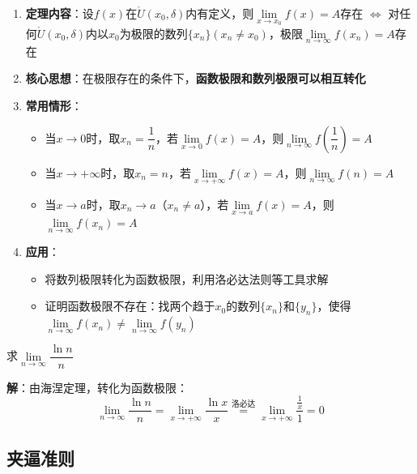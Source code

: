 \documentclass[a4paper,12pt]{article}
\begin{document}
    \begin{enumerate}
        \item \textbf{定理内容}：设$f(x)$在$\mathring{U}(x_0, \delta)$内有定义，则$\lim\limits_{x\to x_0} f(x) = A$存在 $\Leftrightarrow$ 对任何$\mathring{U}(x_0, \delta)$内以$x_0$为极限的数列$\{x_n\}(x_n \neq x_0)$，极限$\lim\limits_{n\to\infty} f(x_n) = A$存在

        \item \textbf{核心思想}：在极限存在的条件下，\textbf{函数极限和数列极限可以相互转化}

        \item \textbf{常用情形}：
        \begin{itemize}
            \item 当$x\to 0$时，取$x_n = \dfrac{1}{n}$，若$\lim\limits_{x\to 0} f(x) = A$，则$\lim\limits_{n\to\infty} f\left(\dfrac{1}{n}\right) = A$
            \item 当$x\to +\infty$时，取$x_n = n$，若$\lim\limits_{x\to +\infty} f(x) = A$，则$\lim\limits_{n\to\infty} f(n) = A$
            \item 当$x\to a$时，取$x_n \to a$（$x_n \neq a$），若$\lim\limits_{x\to a} f(x) = A$，则$\lim\limits_{n\to\infty} f(x_n) = A$
        \end{itemize}

        \item \textbf{应用}：
        \begin{itemize}
            \item 将数列极限转化为函数极限，利用洛必达法则等工具求解
            \item 证明函数极限不存在：找两个趋于$x_0$的数列$\{x_n\}$和$\{y_n\}$，使得$\lim\limits_{n\to\infty} f(x_n) \neq \lim\limits_{n\to\infty} f(y_n)$
        \end{itemize}
    \end{enumerate}

    \begin{analysisbox}[示例]
        求$\lim\limits_{n\to\infty} \dfrac{\ln n}{n}$

        \textbf{解}：由海涅定理，转化为函数极限：
        \[
            \lim_{n\to\infty} \frac{\ln n}{n} = \lim_{x\to+\infty} \frac{\ln x}{x} \overset{\text{洛必达}}{=} \lim_{x\to+\infty} \frac{\frac{1}{x}}{1} = 0
        \]
    \end{analysisbox}

    \subsection{夹逼准则}
\end{document}
